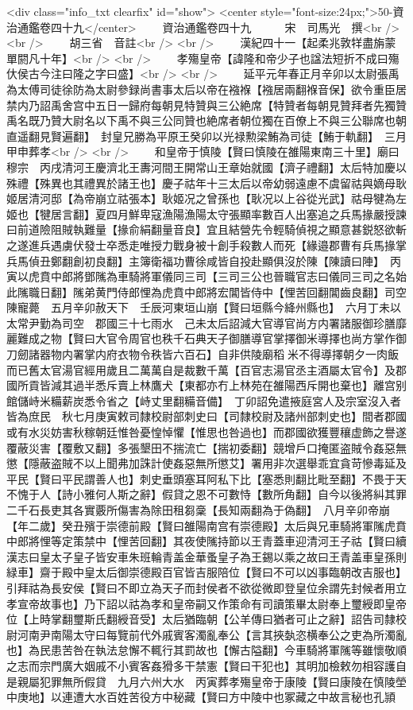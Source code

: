 <div class="info_txt clearfix" id="show">
<center style="font-size:24px;">50-資治通鑑卷四十九</center>
  　　資治通鑑卷四十九　　　宋　司馬光　撰<br />
<br />
　　胡三省　音註<br />
<br />
　　漢紀四十一【起柔兆敦䍧盡旃蒙單閼凡十年】<br />
<br />
　　孝殤皇帝【諱隆和帝少子也諡法短折不成曰殤㐲侯古今注曰隆之字曰盛】<br />
<br />
　　延平元年春正月辛卯以太尉張禹為太傅司徒徐防為太尉參録尚書事太后以帝在襁褓【襁居兩翻褓音保】欲令重臣居禁内乃詔禹舍宫中五日一歸府每朝見特贊與三公絶席【特贊者每朝見贊拜者先獨贊禹名既乃贊大尉名以下禹不與三公同贊也絶席者朝位獨在百僚上不與三公聯席也朝直遥翻見賢遍翻】　封皇兄勝為平原王癸卯以光禄勲梁鮪為司徒【鮪于軌翻】　三月甲申葬孝<br />
<br />
　　和皇帝于慎陵【賢曰慎陵在雒陽東南三十里】廟曰穆宗　丙戌清河王慶濟北王夀河間王開常山王章始就國【濟子禮翻】太后特加慶以殊禮【殊異也其禮異於諸王也】慶子祜年十三太后以帝幼弱遠慮不虞留祜與嫡母耿姬居清河邸【為帝崩立祜張本】耿姬况之曾孫也【耿况以上谷從光武】祜母犍為左姬也【犍居言翻】夏四月鮮卑寇漁陽漁陽太守張顯率數百人出塞追之兵馬掾嚴授諫曰前道險阻賊執難量【掾俞絹翻量音良】宜且結營先令輕騎偵視之顯意甚鋭怒欲斬之遂進兵遇虜伏發士卒悉走唯授力戰身被十創手殺數人而死【緣邉郡曹有兵馬掾掌兵馬偵丑鄭翻創初良翻】主簿衛福功曹徐咸皆自投赴顯俱沒於陳【陳讀曰陣】　丙寅以虎賁中郎將鄧隲為車騎將軍儀同三司【三司三公也晉職官志曰儀同三司之名始此隲職日翻】隲弟黄門侍郎悝為虎賁中郎將宏閶皆侍中【悝苦回翻閶齒良翻】司空陳寵薨　五月辛卯赦天下　壬辰河東垣山崩【賢曰垣縣今絳州縣也】　六月丁未以太常尹勤為司空　郡國三十七雨水　己未太后詔減大官導官尚方内署諸服御珍膳靡麗難成之物【賢曰大官令周官也秩千石典天子御膳導官掌擇御米導擇也尚方掌作御刀劒諸器物内署掌内府衣物令秩皆六百石】自非供陵廟稻米不得導擇朝夕一肉飯而已舊太官湯官經用歲且二萬萬自是裁數千萬【百官志湯官丞主酒屬太官令】及郡國所貢皆減其過半悉斥賣上林鷹犬【東都亦冇上林苑在雒陽西斥開也棄也】離宫别館儲峙米糒薪炭悉令省之【峙丈里翻糒音備】　丁卯詔免遣掖庭宮人及宗室沒入者皆為庶民　秋七月庚寅敕司隸校尉部刺史曰【司隸校尉及諸州部刺史也】間者郡國或有水災妨害秋稼朝廷惟咎憂惶悼懼【惟思也咎過也】而郡國欲獲豐穰虚飾之譽遂覆蔽災害【覆敷又翻】多張墾田不揣流亡【揣初委翻】競增戶口掩匿盗賊令姦惡無懲【隱蔽盗賊不以上聞弗加誅計使姦惡無所懲艾】署用非次選舉乖宜貪苛慘毒延及平民【賢曰平民謂善人也】刺史垂頭塞耳阿私下比【塞悉則翻比毗至翻】不畏于天不愧于人【詩小雅何人斯之辭】假貸之恩不可數恃【數所角翻】自今以後將糾其罪二千石長吏其各實覈所傷害為除田租芻稾【長知兩翻為于偽翻】　八月辛卯帝崩【年二歲】癸丑殯于崇德前殿【賢曰雒陽南宫有崇德殿】太后與兄車騎將軍隲虎賁中郎將悝等定策禁中【悝苦回翻】其夜使隲持節以王青蓋車迎清河王子祜【賢曰續漢志曰皇太子皇子皆安車朱班輪青盖金華蚤皇子為王錫以乘之故曰王青盖車皇孫則緑車】齋于殿中皇太后御崇德殿百官皆吉服陪位【賢曰不可以凶事臨朝改吉服也】引拜祜為長安侯【賢曰不即立為天子而封侯者不欲從微即登皇位余謂先封候者用立孝宣帝故事也】乃下詔以祜為孝和皇帝嗣又作策命有司讀策畢太尉奉上璽綬即皇帝位【上時掌翻璽斯氏翻綬音受】太后猶臨朝【公羊傳曰猶者可止之辭】詔告司隸校尉河南尹南陽太守曰每覽前代外戚賓客濁亂奉公【言其挾埶恣横奉公之吏為所濁亂也】為民患苦咎在執法怠懈不輒行其罰故也【懈古隘翻】今車騎將軍隲等雖懷敬順之志而宗門廣大姻戚不小賓客姦猾多干禁憲【賢曰干犯也】其明加檢敕勿相容護自是親屬犯罪無所假貸　九月六州大水　丙寅葬孝殤皇帝于康陵【賢曰康陵在慎陵塋中庚地】以連遭大水百姓苦役方中秘藏【賢曰方中陵中也冢藏之中故言秘也孔頴